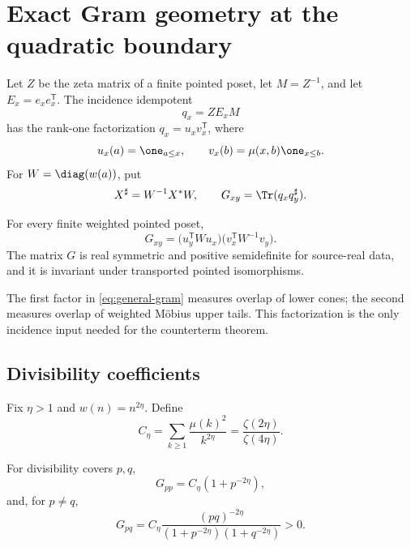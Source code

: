 \section{Exact Gram geometry at the quadratic boundary}
\label{sec:gram}

Let $Z$ be the zeta matrix of a finite pointed poset, let $M=Z^{-1}$,
and let $E_x=e_xe_x^{\mathsf T}$.  The incidence idempotent
\begin{equation}
 q_x=ZE_xM
 \label{eq:qx}
\end{equation}
has the rank-one factorization $q_x=u_xv_x^{\mathsf T}$, where
\begin{equation}
 u_x(a)=\one_{a\le x},
 \qquad
 v_x(b)=\mu(x,b)\one_{x\le b}.
 \label{eq:uv}
\end{equation}
For $W=\diag(w(a))$, put
\begin{equation}
 X^\sharp=W^{-1}X^*W,
 \qquad
 G_{xy}=\Tr(q_xq_y^\sharp).
 \label{eq:sharp-gram}
\end{equation}

\begin{proposition}
\label{prop:general-gram}
For every finite weighted pointed poset,
\begin{equation}
 G_{xy}
 =\bigl(u_y^{\mathsf T}Wu_x\bigr)
  \bigl(v_x^{\mathsf T}W^{-1}v_y\bigr).
 \label{eq:general-gram}
\end{equation}
The matrix $G$ is real symmetric and positive semidefinite for source-real
data, and it is invariant under transported pointed isomorphisms.
\end{proposition}

The first factor in \eqref{eq:general-gram} measures overlap of lower cones;
the second measures overlap of weighted M\"obius upper tails.  This
factorization is the only incidence input needed for the counterterm theorem.

\subsection{Divisibility coefficients}

Fix $\eta>1$ and $w(n)=n^{2\eta}$.  Define
\begin{equation}
 C_\eta=\sum_{k\ge1}\frac{\mu(k)^2}{k^{2\eta}}
 =\frac{\zeta(2\eta)}{\zeta(4\eta)}.
 \label{eq:Ceta}
\end{equation}

\begin{theorem}
\label{thm:atom-gram}
For divisibility covers $p,q$,
\begin{equation}
 G_{pp}=C_\eta(1+p^{-2\eta}),
 \label{eq:Gdiag}
\end{equation}
and, for $p\ne q$,
\begin{equation}
 G_{pq}=C_\eta
 \frac{(pq)^{-2\eta}}
 {(1+p^{-2\eta})(1+q^{-2\eta})}>0.
 \label{eq:Gmixed}
\end{equation}
\end{theorem}

